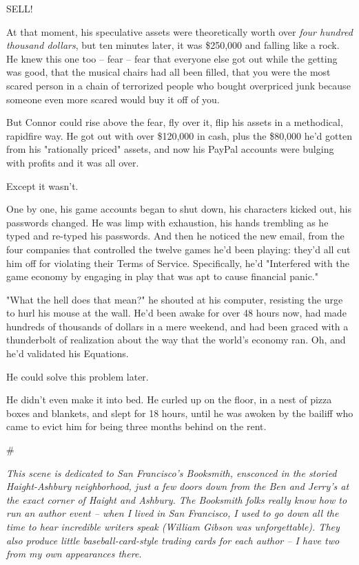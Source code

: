 SELL!

At that moment, his speculative assets were theoretically worth
over \emph{four hundred thousand dollars}, but ten minutes later,
it was \$250,000 and falling like a rock. He knew this one too --
fear -- fear that everyone else got out while the getting was good,
that the musical chairs had all been filled, that you were the most
scared person in a chain of terrorized people who bought overpriced
junk because someone even more scared would buy it off of you.

But Connor could rise above the fear, fly over it, flip his assets
in a methodical, rapidfire way. He got out with over \$120,000 in
cash, plus the \$80,000 he'd gotten from his "rationally priced"
assets, and now his PayPal accounts were bulging with profits and
it was all over.

Except it wasn't.

One by one, his game accounts began to shut down, his characters
kicked out, his passwords changed. He was limp with exhaustion, his
hands trembling as he typed and re-typed his passwords. And then he
noticed the new email, from the four companies that controlled the
twelve games he'd been playing: they'd all cut him off for
violating their Terms of Service. Specifically, he'd "Interfered
with the game economy by engaging in play that was apt to cause
financial panic."

"What the hell does that mean?" he shouted at his computer,
resisting the urge to hurl his mouse at the wall. He'd been awake
for over 48 hours now, had made hundreds of thousands of dollars in
a mere weekend, and had been graced with a thunderbolt of
realization about the way that the world's economy ran. Oh, and
he'd validated his Equations.

He could solve this problem later.

He didn't even make it into bed. He curled up on the floor, in a
nest of pizza boxes and blankets, and slept for 18 hours, until he
was awoken by the bailiff who came to evict him for being three
months behind on the rent.

\#

\emph{This scene is dedicated to San Francisco's Booksmith, ensconced in the storied Haight-Ashbury neighborhood, just a few doors down from the Ben and Jerry's at the exact corner of Haight and Ashbury. The Booksmith folks really know how to run an author event -- when I lived in San Francisco, I used to go down all the time to hear incredible writers speak (William Gibson was unforgettable). They also produce little baseball-card-style trading cards for each author -- I have two from my own appearances there.}

